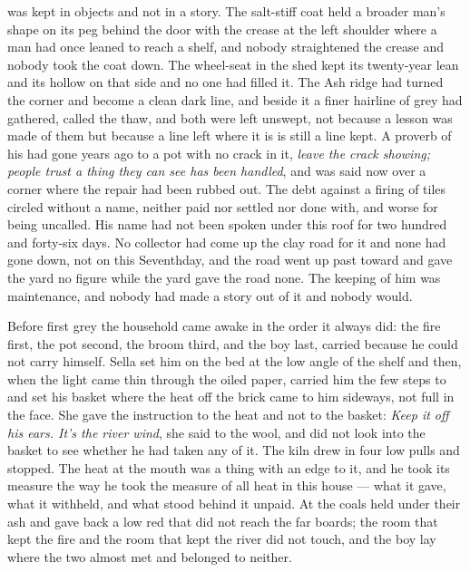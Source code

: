  was kept in objects and not in a story. The salt-stiff coat held a broader man's shape on its peg behind the door with the crease at the left shoulder where a man had once leaned to reach a shelf, and nobody straightened the crease and nobody took the coat down. The wheel-seat in the shed kept its twenty-year lean and its hollow on that side and no one had filled it. The Ash ridge had turned the corner and become a clean dark line, and beside it a finer hairline of grey had gathered, called the thaw, and both were left unswept, not because a lesson was made of them but because a line left where it is is still a line kept. A proverb of his had gone years ago to a pot with no crack in it, \emph{leave the crack showing; people trust a thing they can see has been handled}, and was said now over a corner where the repair had been rubbed out. The debt against a firing of tiles circled without a name, neither paid nor settled nor done with, and worse for being uncalled. His name had not been spoken under this roof for two hundred and forty-six days. No collector had come up the clay road for it and none had gone down, not on this Seventhday, and the road went up past  toward  and gave the yard no figure while the yard gave the road none. The keeping of him was maintenance, and nobody had made a story out of it and nobody would.

\scenebreak

Before first grey the household came awake in the order it always did: the fire first, the pot second, the broom third, and the boy last, carried because he could not carry himself. Sella set him on the bed at the low angle of the shelf and then, when the light came thin through the oiled paper, carried him the few steps to  and set his basket where the heat off the brick came to him sideways, not full in the face. She gave the instruction to the heat and not to the basket: \emph{Keep it off his ears. It's the river wind}, she said to the wool, and did not look into the basket to see whether he had taken any of it. The kiln drew in four low pulls and stopped. The heat at the mouth was a thing with an edge to it, and he took its measure the way he took the measure of all heat in this house --- what it gave, what it withheld, and what stood behind it unpaid. At  the coals held under their ash and gave back a low red that did not reach the far boards; the room that kept the fire and the room that kept the river did not touch, and the boy lay where the two almost met and belonged to neither.


